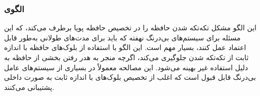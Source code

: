 \subsubsection{الگوی }
\label{memFixSizeBufSec}
\begin{RTL}
این الگو مشکل تکه‌تکه شدن حافظه را در تخصیص حافظه پویا برطرف می‌کند،
که این مسئله برای سیستم‌های بی‌درنگ نهفته که باید برای مدت‌های طولانی
به‌طور قابل اعتماد عمل کنند، بسیار مهم است.
این الگو با استفاده از بلوک‌های حافظه با اندازه ثابت از تکه‌تکه شدن
جلوگیری می‌کند، اگرچه منجر به هدر رفتن بخشی از حافظه به دلیل
استفاده غیر بهینه می‌شود. این مصالحه معمولاً در بسیاری از
سیستم‌های عامل بی‌درنگ قابل قبول است که اغلب از
تخصیص بلوک‌های با اندازه ثابت به صورت داخلی پشتیبانی می‌کنند.
\end{RTL}